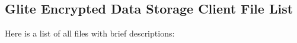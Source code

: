 \subsection{Glite Encrypted Data Storage Client File List}
Here is a list of all files with brief descriptions:\begin{CompactList}
\item{}
\end{CompactList}
